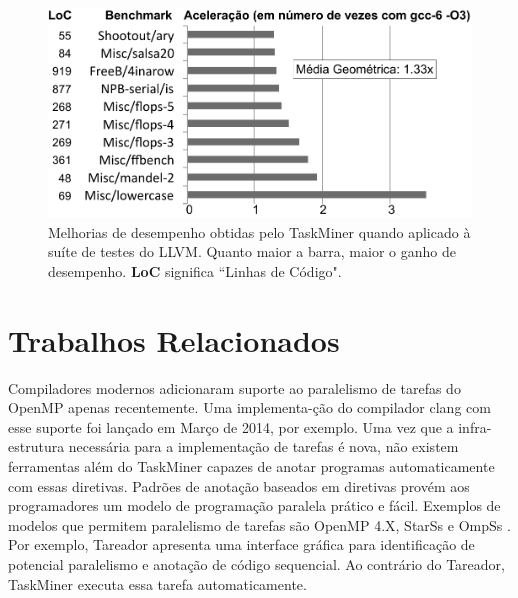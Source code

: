 \documentclass[sigplan,10pt,review]{acmart}
\newcommand\Taskminer{\mbox{\textsf{TaskMiner}}}
\begin{document}
\begin{figure}[t!]
\begin{center}
\includegraphics[width=1\columnwidth]{images/TM_GeneralProgs}
\caption{Melhorias de desempenho obtidas pelo \Taskminer{} quando aplicado à suíte de testes
do LLVM. Quanto maior a barra, maior o ganho de desempenho.
\textbf{LoC} significa ``Linhas de Código".}
\label{fig:TM_GeneralProgs}
\end{center}
\end{figure}




\section{Trabalhos Relacionados}
\label{sec:rw}

Compiladores modernos adicionaram suporte ao paralelismo de tarefas do OpenMP apenas recentemente. Uma implementa-\c{c}\~{a}o
do compilador \textsf{clang} com esse suporte foi lançado em Março de 2014, por exemplo. Uma vez que a infra-estrutura necessária para
a implementação de tarefas é nova, não existem ferramentas além do {\Taskminer} capazes de anotar programas
automaticamente com essas diretivas.
Padrões de anotação baseados em diretivas provém aos programadores um modelo de programação paralela prático e fácil. Exemplos
de modelos que permitem paralelismo de tarefas são OpenMP 4.X,
StarSs \cite{planas:hpca:2009} e OmpSs \cite{duran:ppl:2011}.
Por exemplo, Tareador \cite{Ayguade15} apresenta uma interface gráfica para identificação de potencial paralelismo e anotação de código sequencial.
Ao contrário do Tareador, {\Taskminer} executa essa tarefa automaticamente.
\end{document}

